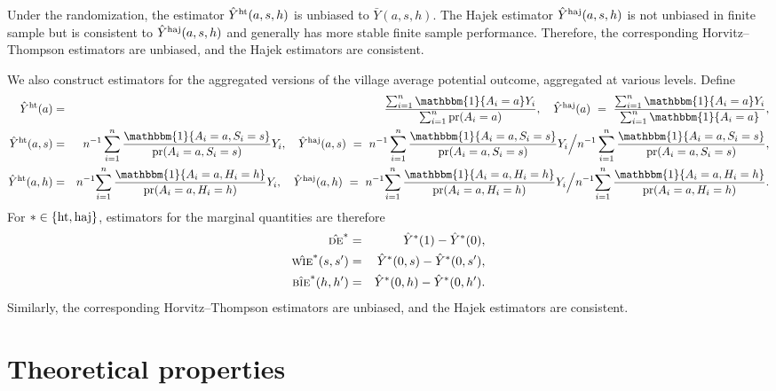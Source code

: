 \documentclass{article}
\newcommand{\pr}{\textup{pr}}
\newcommand{\sumi}{\sum_{i=1}^n}
\newcommand{\de}{\textsc{de}}
\newcommand{\bie}{\textsc{bie}}
\newcommand{\wie}{\textsc{wie}}
\newcommand{\horthom}{\textup{ht}}
\newcommand{\haj}{\textup{haj}}
\newcommand{\indicator}{\mathbbm{1}}
\begin{document}
Under the randomization, the estimator $\hat{Y}^{\horthom}(a,s,h)$ is unbiased to $\bar{Y}(a,s,h)$. The Hajek estimator $\hat{Y}^{\haj}(a,s,h)$ is not unbiased in finite sample but is consistent to $\hat{Y}^{\haj}(a,s,h)$ and generally has more stable finite sample performance. Therefore, the corresponding Horvitz--Thompson estimators are unbiased, and the Hajek estimators are consistent.

We also construct estimators for the aggregated versions of the village average potential outcome, aggregated at various levels. Define
\begin{eqnarray*}
    \hat{Y}^{\horthom}(a) &=& \frac{\sumi\indicator\{A_{i}=a\} Y_{i}}{\sumi\pr(A_{i}=a)}, \quad \hat{Y}^{\haj}(a) \ =\ \frac{\sumi\indicator\{A_{i}=a\} Y_{i}}{\sumi\indicator\{A_{i}=a\}}, \\
    \hat{Y}^{\horthom}(a,s) &=& n^{-1}\sumi\frac{\indicator\{A_{i}=a, S_{i}=s\} }{\pr(A_{i}=a, S_{i}=s)}Y_{i}, \quad \hat{Y}^{\haj}(a,s) \ =\  n^{-1}\sumi\frac{\indicator\{A_{i}=a, S_{i}=s\} }{\pr(A_{i}=a, S_{i}=s)}Y_{i}\Big/ n^{-1}\sumi\frac{\indicator\{A_{i}=a, S_{i}=s\}}{\pr(A_{i}=a, S_{i}=s)}, \\
    \hat{Y}^{\horthom}(a,h) &=& n^{-1}{\sumi \frac{\indicator\{A_{i}=a, H_{i}=h\}}{\pr(A_{i}=a, H_{i}=h)} }Y_{i}, \quad \hat{Y}^{\haj}(a,h) \ =\  n^{-1}{\sumi \frac{\indicator\{A_{i}=a, H_{i}=h\}}{\pr(A_{i}=a, H_{i}=h)} Y_{i}} \Big/ n^{-1}
    {\sumi \frac{\indicator\{A_{i}=a, H_{i}=h\}}{\pr(A_{i}=a, H_{i}=h)} }.
\end{eqnarray*}
For $*\in\{\horthom,\haj\}$, estimators for the marginal quantities are therefore
\begin{eqnarray*}
    \hat{\de}^{*} &=& \hat{Y}^{*}(1) - \hat{Y}^{*}(0), \\
    \hat{\wie}^{*}(s,s^{\prime}) &=& \hat{Y}^{*}(0,s) - \hat{Y}^{*}(0,s^{\prime}), \\
    \hat{\bie}^{*}(h,h^{\prime}) &=& \hat{Y}^{*}(0,h) - \hat{Y}^{*}(0,h^{\prime}).
\end{eqnarray*}
Similarly, the corresponding Horvitz--Thompson estimators are unbiased, and the Hajek estimators are consistent.

\section{Theoretical properties}
\end{document}

